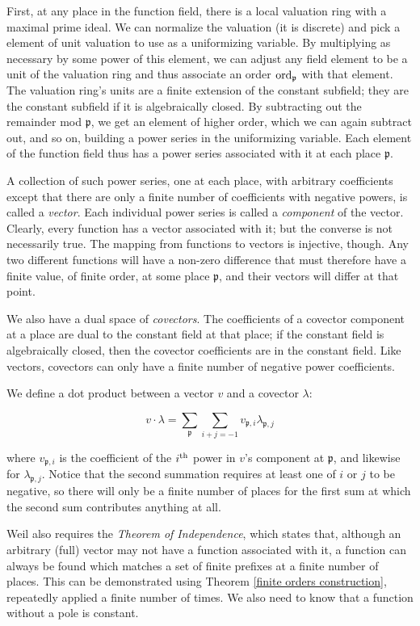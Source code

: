 First, at any place in the function field, there is a local valuation
ring with a maximal prime ideal.  We can normalize the valuation (it
is discrete) and pick a element of unit valuation to use as a
uniformizing variable.  By multiplying as necessary by some power of
this element, we can adjust any field element to be a unit of the
valuation ring and thus associate an order ${\rm ord}_{\mathfrak{p}}$
with that element.  The valuation ring's units are a finite extension
of the constant subfield; they are the constant subfield if it is
algebraically closed.  By subtracting out the remainder mod
$\mathfrak{p}$, we get an element of higher order, which we can again
subtract out, and so on, building a power series in the uniformizing
variable.  Each element of the function field thus has a power series
associated with it at each place $\mathfrak{p}$.

A collection of such power series, one at each place, with arbitrary
coefficients except that there are only a finite number of
coefficients with negative powers, is called a {\it vector}.  Each
individual power series is called a {\it component} of the vector.
Clearly, every function has a vector associated with it; but the
converse is not necessarily true.  The mapping from functions to
vectors is injective, though.  Any two different functions will have a
non-zero difference that must therefore have a finite value, of finite
order, at some place $\mathfrak{p}$, and their vectors will differ at
that point.

We also have a dual space of {\it covectors}.  The coefficients of a
covector component at a place are dual to the constant field at that
place; if the constant field is algebraically closed, then the
covector coefficients are in the constant field.  Like vectors,
covectors can only have a finite number of negative power
coefficients.

We define a dot product between a vector $v$ and a covector $\lambda$:

$$ v \cdot \lambda = \sum_{\mathfrak{p}} \sum_{i+j=-1} v_{\mathfrak{p},i}
  \lambda_{\mathfrak{p},j} $$

where $v_{\mathfrak{p},i}$ is the coefficient of the $i^{\rm th}$
power in $v$'s component at $\mathfrak{p}$, and likewise for
$\lambda_{\mathfrak{p},j}$.  Notice that the second summation requires
at least one of $i$ or $j$ to be negative, so there will only be a
finite number of places for the first sum at which the second sum
contributes anything at all.

Weil also requires the {\it Theorem of Independence}, which states
that, although an arbitrary (full) vector may not have a function
associated with it, a function can always be found which matches a set
of finite prefixes at a finite number of places.  This can be
demonstrated using Theorem \ref{finite orders construction},
repeatedly applied a finite number of times.  We also need to know
that a function without a pole is constant.

